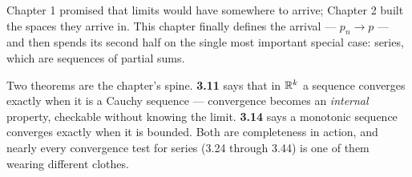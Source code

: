 
\begin{roadmap}
Chapter 1 promised that limits would have somewhere to arrive; Chapter 2 built
the spaces they arrive in. This chapter finally defines the arrival ---
$p_n \to p$ --- and then spends its second half on the single most important
special case: series, which are sequences of partial sums.

\medskip
Two theorems are the chapter's spine. \textbf{3.11} says that in $\mathbb{R}^k$ a
sequence converges exactly when it is a Cauchy sequence --- convergence
becomes an \emph{internal} property, checkable without knowing the limit.
\textbf{3.14} says a monotonic sequence converges exactly when it is bounded.
Both are completeness in action, and nearly every convergence test for series
(3.24 through 3.44) is one of them wearing different clothes.
\end{roadmap}

